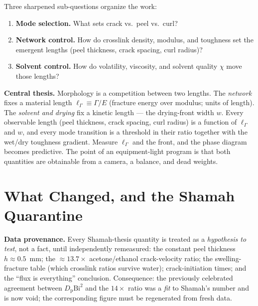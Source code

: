 \documentclass[12pt,letterpaper]{article}
\newcommand{\Gfrac}{\Gamma}
\newcommand{\Emod}{E}
\newcommand{\lG}{\ell_{\Gfrac}}          %
\newcommand{\Dp}{D_{\mathrm{p}}}
\newcommand{\chiFH}{\chi}
\newcommand{\Bi}{\mathrm{Bi}}
\begin{document}
\noindent Three sharpened sub-questions organize the work:
\begin{enumerate}[label=\textbf{Q\arabic*.},leftmargin=2.6em,itemsep=1pt]
\item \textbf{Mode selection.} What sets crack vs.\ peel vs.\ curl?
\item \textbf{Network control.} How do crosslink density, modulus, and toughness
set the emergent lengths (peel thickness, crack spacing, curl radius)?
\item \textbf{Solvent control.} How do volatility, viscosity, and solvent quality
$\chiFH$ move those lengths?
\end{enumerate}

\begin{intuitionbox}
\textbf{Central thesis.} Morphology is a competition between two lengths. The
\emph{network} fixes a material length $\lG \equiv \Gfrac/\Emod$ (fracture energy
over modulus; units of length). The \emph{solvent and drying} fix a kinetic
length --- the drying-front width $w$. Every observable length (peel thickness,
crack spacing, curl radius) is a function of $\lG$ and $w$, and every mode
transition is a threshold in their ratio together with the wet/dry toughness
gradient. Measure $\lG$ and the front, and the phase diagram becomes predictive.
The point of an equipment-light program is that both quantities are obtainable
from a camera, a balance, and dead weights.
\end{intuitionbox}

\section{What Changed, and the Shamah Quarantine}
\begin{cautionbox}
\textbf{Data provenance.} Every Shamah-thesis quantity is treated as a
\emph{hypothesis to test}, not a fact, until independently remeasured:
the constant peel thickness $h\!\approx\!0.5$~mm; the $\approx\!13.7\times$
acetone/ethanol crack-velocity ratio; the swelling-fracture table (which
crosslink ratios survive water); crack-initiation times; and the ``flux is
everything'' conclusion. Consequence: the previously celebrated agreement
between $\Dp\Bi^2$ and the $14\times$ ratio was a \emph{fit} to Shamah's number
and is now void; the corresponding figure must be regenerated from fresh data.
\end{cautionbox}
\end{document}
